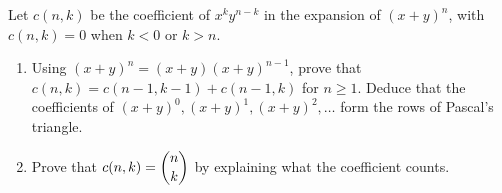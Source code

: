Let $c(n,k)$ be the coefficient of $x^ky^{n-k}$ in the expansion of $(x+y)^n$, with $c(n,k)=0$ when $k<0$ or $k>n$.
\begin{enumerate}
\item[(a)] Using $(x+y)^n=(x+y)(x+y)^{n-1}$, prove that $c(n,k)=c(n-1,k-1)+c(n-1,k)$ for $n\ge1$. Deduce that the coefficients of $(x+y)^0,(x+y)^1,(x+y)^2,\dots$ form the rows of Pascal's triangle.
\item[(b)] Prove that $c(n,k)=\dbinom nk$ by explaining what the coefficient counts.
\end{enumerate}
